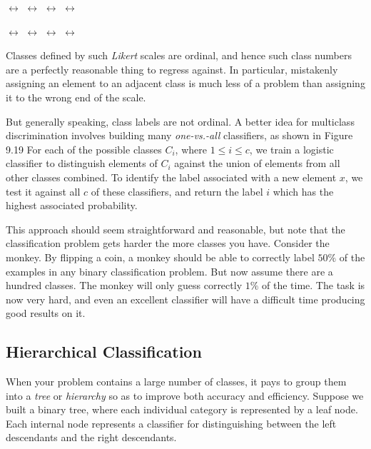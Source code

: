 \documentclass[10pt]{article}
\begin{document}
\begin{center}
     \(\leftrightarrow\)  \(\leftrightarrow\)  \(\leftrightarrow\)  \(\leftrightarrow\) 
    
    \medskip
    
     \(\leftrightarrow\)  \(\leftrightarrow\)  \(\leftrightarrow\)  \(\leftrightarrow\) 
\end{center}

Classes defined by such \emph{Likert} scales are ordinal, and hence such class numbers are a perfectly reasonable thing to regress against. In particular, mistakenly assigning an element to an adjacent class is much less of a problem than assigning it to the wrong end of the scale.

But generally speaking, class labels are not ordinal. A better idea for multiclass discrimination involves building many \emph{one-vs.-all} classifiers, as shown in Figure 9.19 For each of the possible classes \(C_{i}\), where \(1 \leq i \leq c\), we train a logistic classifier to distinguish elements of \(C_{i}\) against the union of elements from all other classes combined. To identify the label associated with a new element \(x\), we test it against all \(c\) of these classifiers, and return the label \(i\) which has the highest associated probability.

This approach should seem straightforward and reasonable, but note that the classification problem gets harder the more classes you have. Consider the monkey. By flipping a coin, a monkey should be able to correctly label \(50\%\) of the examples in any binary classification problem. But now assume there are a hundred classes. The monkey will only guess correctly \(1\%\) of the time. The task is now very hard, and even an excellent classifier will have a difficult time producing good results on it.

\subsection{Hierarchical Classification}
When your problem contains a large number of classes, it pays to group them into a \emph{tree} or \emph{hierarchy} so as to improve both accuracy and efficiency. Suppose we built a binary tree, where each individual category is represented by a leaf node. Each internal node represents a classifier for distinguishing between the left descendants and the right descendants.
\end{document}
